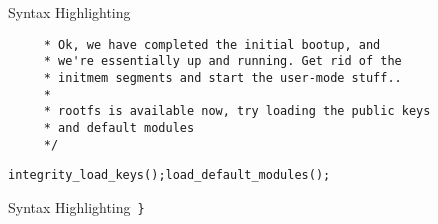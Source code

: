 \begin{frame}{Syntax Highlighting}
\begin{verbatim}
	 * Ok, we have completed the initial bootup, and
	 * we're essentially up and running. Get rid of the
	 * initmem segments and start the user-mode stuff..
	 *
	 * rootfs is available now, try loading the public keys
	 * and default modules
	 */\end{verbatim}\leavevmode\newline\newline\tab\color{Aquamarine}\verb$integrity_load_keys$\color{Fuchsia}\verb$($\color{Fuchsia}\verb$)$\color{Fuchsia}\verb$;$\newline\tab\color{Aquamarine}\verb$load_default_modules$\color{Fuchsia}\verb$($\color{Fuchsia}\verb$)$\color{Fuchsia}\verb$;$
\end{frame}
\begin{frame}{Syntax Highlighting}~\newline\color{Fuchsia}\verb$}$\newline
\end{frame}
